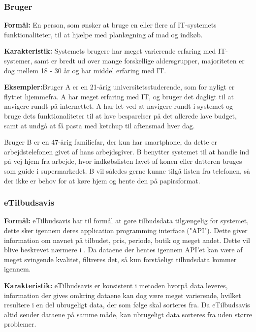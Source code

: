 \subsubsection*{Bruger}

\textbf{Formål:} En person, som ønsker at bruge en eller flere af IT-systemets funktionaliteter, til at hjælpe med planlægning af mad og indkøb.

\textbf{Karakteristik:} Systemets brugere har meget varierende erfaring med IT-systemer, samt er bredt ud over mange forskellige aldersgrupper, majoriteten er dog mellem 18 - 30 år og har middel erfaring med IT.

\textbf{Eksempler:}Bruger A er en 21-årig universitetsstuderende, som for nyligt er flyttet hjemmefra. A har meget erfaring med IT, og bruger det dagligt til at navigere rundt på internettet.
A har let ved at navigere rundt i systemet og bruge dets funktionaliteter til at lave besparelser på det allerede lave budget, samt at undgå at få pasta med ketchup til aftensmad hver dag.

Bruger B er en 47-årig familiefar, der kun har smartphone, da dette er arbejdstelefonen givet af hans arbejdsgiver.
B benytter systemet til at handle ind på vej hjem fra arbejde, hvor indkøbslisten lavet af konen eller datteren bruges som guide i supermarkedet.
B vil således gerne kunne tilgå listen fra telefonen, så der ikke er behov for at køre hjem og hente den på papirsformat.

\subsubsection*{eTilbudsavis}

\textbf{Formål:} eTilbudsavis har til formål at gøre tilbudsdata tilgængelig for systemet, dette sker igennem deres application programming interface ("API").
Dette giver information om navnet på tilbudet, pris, periode, butik og meget andet. 
Dette vil blive beskrevet nærmere i .
Da dataene der hentes igennem API'et kan være af meget svingende kvalitet, filtreres det, så kun forståeligt tilbudsdata kommer igennem.

\textbf{Karakteristik:} eTilbudsavis er konsistent i metoden hvorpå data leveres, information der gives omkring dataene kan dog være meget varierende, hvilket resultere i en del ubrugeligt data, der som følge skal sorteres fra.
Da eTilbudsavis altid sender dataene på samme måde, kan ubrugeligt data sorteres fra uden større problemer. 

